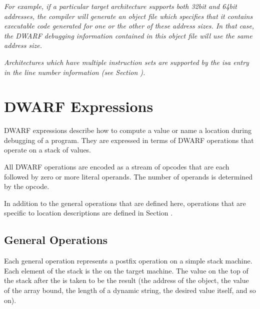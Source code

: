 \textit{%
For example, if a particular target architecture supports
both 32\dash bit and 64\dash bit addresses, the compiler will generate
an object file which specifies that it contains executable
code generated for one or the other of these 
address sizes. In
that case, the DWARF debugging information contained in this
object file will use the same address size.
}

\textit{%
Architectures which have multiple instruction sets are
supported by the isa entry in the line number information
(see Section ).
}

\section{DWARF Expressions}
\label{chap:dwarfexpressions}
DWARF expressions describe how to compute a value or name a
location during debugging of a program. 
They are expressed in
terms of DWARF operations that operate on a stack of values.

All DWARF operations are encoded as a stream of opcodes that
are each followed by zero or more literal operands. 
The number
of operands is determined by the opcode.  

In addition to the
general operations that are defined here, operations that are
specific to location descriptions are defined in 
Section .

\subsection{General Operations}
\label{chap:generaloperations}
Each general operation represents a postfix operation on
a simple stack machine. Each element of the stack is the
 on the target machine. 
The value on the
top of the stack after  the 
is 
taken to be the result (the address of the object, the
value of the array bound, the length of a dynamic string,
the desired value itself, and so on).


